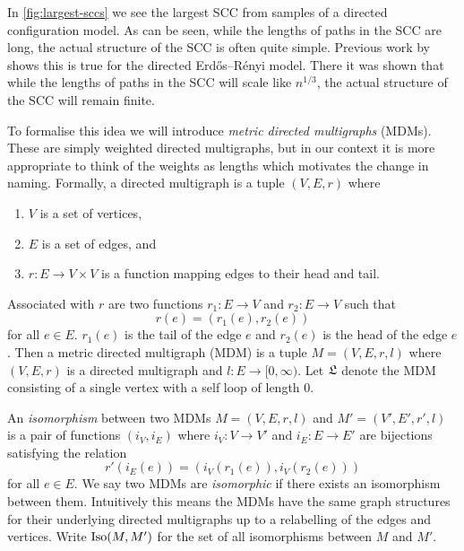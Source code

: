 In \cref{fig:largest-sccs} we see the largest SCC from samples of a directed configuration model. As can be seen, while the lengths of paths in the SCC are long, the actual structure of the SCC is often quite simple. Previous work by \citet{goldschmidtScalingLimitCritical2019} shows this is true for the directed Erdős--Rényi model. There it was shown that while the lengths of paths in the SCC will scale like $n^{1/3}$, the actual structure of the SCC will remain finite.

To formalise this idea we will introduce \emph{metric directed multigraphs} (MDMs). These are simply weighted directed multigraphs, but in our context it is more appropriate to think of the weights as lengths which motivates the change in naming. Formally, a directed multigraph is a tuple $(V, E, r)$ where
\begin{enumerate}
    \item $V$ is a set of vertices,
    \item $E$ is a set of edges, and
    \item $r: E \to V \times V$ is a function mapping edges to their head and tail.
\end{enumerate}
Associated with $r$ are two functions $r_1: E \to V$ and $r_2: E \to V$ such that
\begin{equation*}
    r(e) = (r_1(e), r_2(e))
\end{equation*}
for all $e \in E$. $r_1(e)$ is the tail of the edge $e$ and $r_2(e)$ is the head of the edge $e$. Then a metric directed multigraph (MDM) is a tuple $M = (V, E, r, l)$ where $(V, E, r)$ is a directed multigraph and $l:E \to [0, \infty)$. Let $\mathfrak L$ denote the MDM consisting of a single vertex with a self loop of length 0.

An \emph{isomorphism} between two MDMs $M = (V, E, r, l)$ and $M' = (V', E', r', l)$ is a pair of functions $(i_V, i_E)$ where $i_V: V \to V'$ and $i_E: E \to E'$ are bijections satisfying the relation
\begin{equation*}
    r'(i_E(e)) = (i_V(r_1(e)), i_V(r_2(e)))
\end{equation*}
for all $e \in E$. We say two MDMs are \emph{isomorphic} if there exists an isomorphism between them. Intuitively this means the MDMs have the same graph structures for their underlying directed multigraphs up to a relabelling of the edges and vertices. Write $\operatorname{Iso}(M, M')$ for the set of all isomorphisms between $M$ and $M'$.

